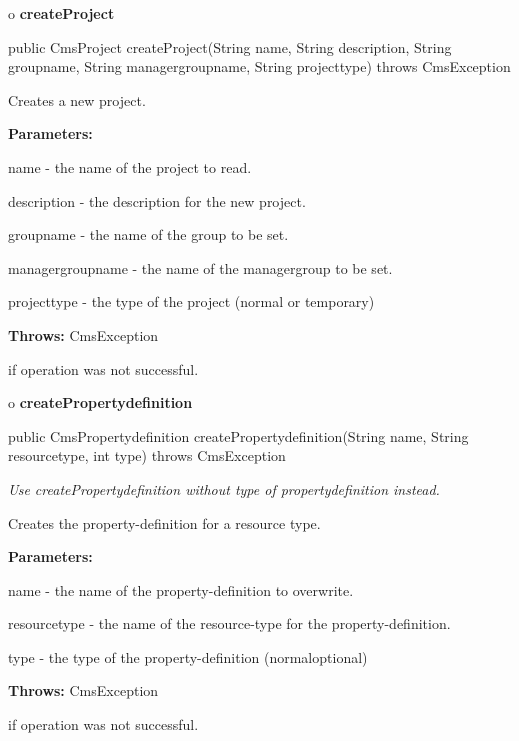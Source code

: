 o {\bf createProject}

\begin{PRE}
 public CmsProject createProject(String name,
                                 String description,
                                 String groupname,
                                 String managergroupname,
                                 String projecttype) throws CmsException
\end{PRE}

\begin{description}
\htmlDD Creates a new project.

\begin{description}
\item {\bf Parameters:}

name - the name of the project to read.

description - the description for the new project.

groupname - the name of the group to be set.

managergroupname - the name of the managergroup to be set.

projecttype - the type of the project (normal or temporary)
\item {\bf Throws:} CmsException

if operation was not successful.
\end{description}

\end{description}

o {\bf createPropertydefinition}

\begin{PRE}
 public CmsPropertydefinition createPropertydefinition(String name,
                                                       String resourcetype,
                                                       int type) throws CmsException
\end{PRE}

\begin{description}
 {\it Use
createPropertydefinition without type of propertydefinition instead.}

Creates the property-definition for a resource type.

\begin{description}
\item {\bf Parameters:}

name - the name of the property-definition to overwrite.

resourcetype - the name of the resource-type for the property-definition.

type - the type of the property-definition (normal{\htmlBar}optional)
\item {\bf Throws:} CmsException

if operation was not successful.
\end{description}

\end{description}

